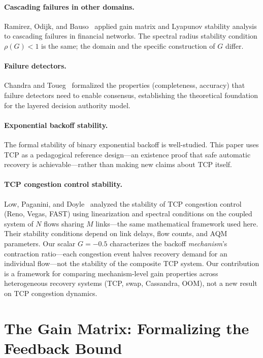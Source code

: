 \documentclass[11pt]{article}
\begin{document}
\paragraph{Cascading failures in other domains.} Ramirez, Odijk, and
Bauso~\cite{ramirez2023cascading} applied gain matrix and Lyapunov stability
analysis to cascading failures in financial networks. The spectral radius
stability condition $\rho(G) < 1$ is the same; the domain and the specific
construction of $G$ differ.

\paragraph{Failure detectors.} Chandra and Toueg~\cite{chandra1996unreliable}
formalized the properties (completeness, accuracy) that failure detectors need to
enable consensus, establishing the theoretical foundation for the layered
decision authority model.

\paragraph{Exponential backoff stability.} The formal stability of binary
exponential backoff is well-studied. This paper uses TCP as a pedagogical
reference design---an existence proof that safe automatic recovery is
achievable---rather than making new claims about TCP itself.

\paragraph{TCP congestion control stability.} Low, Paganini, and
Doyle~\cite{low2002internet} analyzed the stability of TCP congestion control
(Reno, Vegas, FAST) using linearization and spectral conditions on the coupled
system of $N$ flows sharing $M$ links---the same mathematical framework used
here. Their stability conditions depend on link delays, flow counts, and AQM
parameters. Our scalar $G = -0.5$ characterizes the backoff \emph{mechanism}'s
contraction ratio---each congestion event halves recovery demand for an
individual flow---not the stability of the composite TCP system. Our
contribution is a framework for comparing mechanism-level gain properties across
heterogeneous recovery systems (TCP, swap, Cassandra, OOM), not a new result on
TCP congestion dynamics.

\appendix

\section{The Gain Matrix: Formalizing the Feedback Bound}
\label{sec:gain-matrix}
\end{document}

